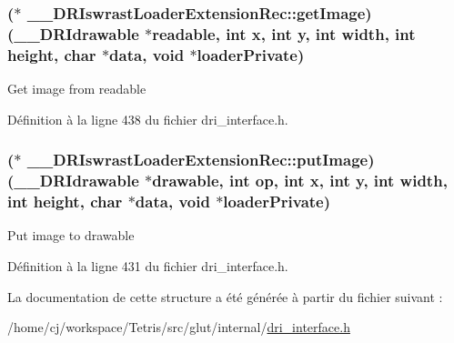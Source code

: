 \hypertarget{struct_____d_r_iswrast_loader_extension_rec_a0ea3e830001252e2384246efab900556}{
\subsubsection[{get\-Image}]{($\ast$ \-\_\-\-\_\-\-D\-R\-Iswrast\-Loader\-Extension\-Rec\-::get\-Image)({\bf \-\_\-\-\_\-\-D\-R\-Idrawable} $\ast$readable, int {\bf x}, int {\bf y}, int {\bf width}, int {\bf height}, char $\ast${\bf data}, {\bf void} $\ast$loader\-Private)}}\label{struct_____d_r_iswrast_loader_extension_rec_a0ea3e830001252e2384246efab900556}
Get image from readable 

Définition à la ligne 438 du fichier dri\-\_\-interface.\-h.

\hypertarget{struct_____d_r_iswrast_loader_extension_rec_a4e7a71f670fe54938191a8b871754bde}{
\subsubsection[{put\-Image}]{($\ast$ \-\_\-\-\_\-\-D\-R\-Iswrast\-Loader\-Extension\-Rec\-::put\-Image)({\bf \-\_\-\-\_\-\-D\-R\-Idrawable} $\ast$drawable, int op, int {\bf x}, int {\bf y}, int {\bf width}, int {\bf height}, char $\ast${\bf data}, {\bf void} $\ast$loader\-Private)}}\label{struct_____d_r_iswrast_loader_extension_rec_a4e7a71f670fe54938191a8b871754bde}
Put image to drawable 

Définition à la ligne 431 du fichier dri\-\_\-interface.\-h.



La documentation de cette structure a été générée à partir du fichier suivant \-:\begin{DoxyCompactItemize}
\item 
/home/cj/workspace/\-Tetris/src/glut/internal/\hyperlink{dri__interface_8h}{dri\-\_\-interface.\-h}\end{DoxyCompactItemize}
